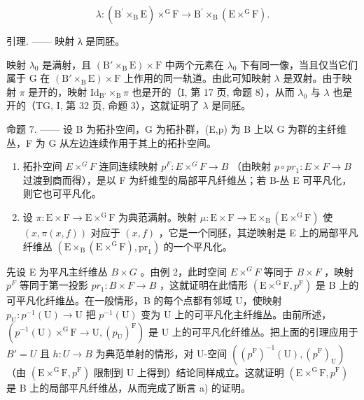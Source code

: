 \[
\lambda \colon (\mathrm{B} ^ {\prime} \times_ {\mathrm{B}} \mathrm{E}) \times^ {\mathrm{G}} \mathrm{F} \rightarrow \mathrm{B} ^ {\prime} \times_ {\mathrm{B}} (\mathrm{E} \times^ {\mathrm{G}} \mathrm{F}).
\]

引理. —— 映射 λ 是同胚。

映射 \(\lambda_0\) 是满射，且 \((\mathrm{B}' \times_{\mathrm{B}} \mathrm{E}) \times \mathrm{F}\) 中两个元素在 \(\lambda_0\) 下有同一像，当且仅当它们属于 G 在 \((\mathrm{B}' \times_{\mathrm{B}} \mathrm{E}) \times \mathrm{F}\) 上作用的同一轨道。由此可知映射 \(\lambda\) 是双射。由于映射 \(\pi\) 是开的，映射 \(\mathrm{Id}_{\mathrm{B}'} \times_{\mathrm{B}} \pi\) 也是开的（I, 第 17 页, 命题 8），从而 \(\lambda_0\) 与 \(\lambda\) 也是开的（TG, I, 第 32 页, 命题 3），这就证明了 \(\lambda\) 是同胚。

命题 7. —— 设 B 为拓扑空间，G 为拓扑群，(E,p) 为 B 上以 G 为群的主纤维丛，F 为 G 从左边连续作用于其上的拓扑空间。

\begin{enumerate}
\def\labelenumi{\alph{enumi})}
\item
  拓扑空间 \(E \times^{G} F\) 连同连续映射 \(p^{F}: E \times^{G} F \to B\) （由映射 \(p \circ pr_{1}: E \times F \to B\) 过渡到商而得），是以 F 为纤维型的局部平凡纤维丛；若 B-丛 E 可平凡化，则它也可平凡化。
\item
  设 \(\pi\colon\mathrm{E}\times\mathrm{F}\to\mathrm{E}\times^{\mathrm{G}}\mathrm{F}\) 为典范满射。映射 \(\mu\colon\mathrm{E}\times\mathrm{F}\to\mathrm{E}\times_{\mathrm{B}}(\mathrm{E}\times^{\mathrm{G}}\mathrm{F})\) 使 \((x,\pi(x,f))\) 对应于 \((x,f)\) ，它是一个同胚，其逆映射是 E 上的局部平凡纤维丛 \((\mathrm{E}\times_{\mathrm{B}}(\mathrm{E}\times^{\mathrm{G}}\mathrm{F}),\mathrm{pr}_{1})\) 的一个平凡化。
\end{enumerate}

先设 E 为平凡主纤维丛 \(B \times G\) 。由例 2，此时空间 \(E \times^{G} F\) 等同于 \(B \times F\) ，映射 \(p^{F}\) 等同于第一投影 \(pr_{1}: B \times F \to B\) ，这就证明在此情形 \((\mathrm{E} \times^{\mathrm{G}}\mathrm{F}, p^{\mathrm{F}})\) 是 B 上的可平凡化纤维丛。在一般情形，B 的每个点都有邻域 U，使映射 \(p_{\mathrm{U}}: p^{-1}(\mathrm{U}) \to \mathrm{U}\) 把 \(p^{-1}(\mathrm{U})\) 变为 U 上的可平凡化主纤维丛。由前所述，\((p^{-1}(\mathrm{U}) \times^{\mathrm{G}}\mathrm{F} \to \mathrm{U}, (p_{\mathrm{U}})^{\mathrm{F}})\) 是 U 上的可平凡化纤维丛。把上面的引理应用于 \(B' = U\) 且 \(h: U \to B\) 为典范单射的情形，对 U-空间 \(((p^{\mathrm{F}})^{-1}(\mathrm{U}), (p^{\mathrm{F}})_{\mathrm{U}})\) （由 \((\mathrm{E} \times^{\mathrm{G}}\mathrm{F}, p^{\mathrm{F}})\) 限制到 U 上得到）结论同样成立。这就证明 \((\mathrm{E} \times^{\mathrm{G}}\mathrm{F}, p^{\mathrm{F}})\) 是 B 上的局部平凡纤维丛，从而完成了断言 a) 的证明。

